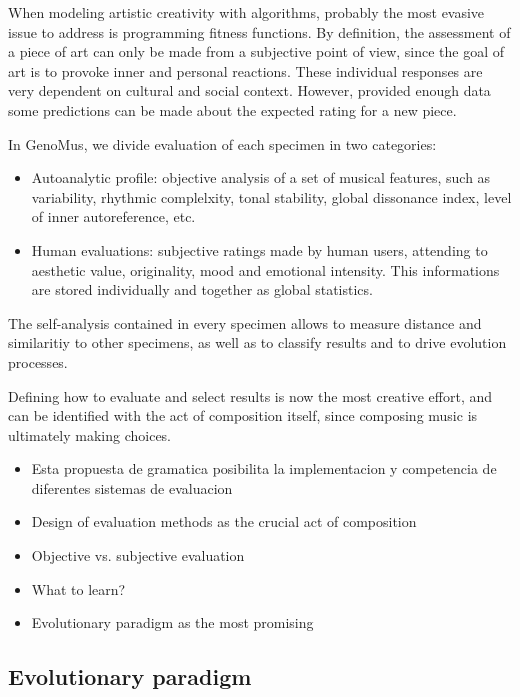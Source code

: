 \documentclass{article}
\begin{document}
When modeling artistic creativity with algorithms, probably the most evasive issue to address is programming fitness functions. By definition, the assessment of a piece of art can only be made from a subjective point of view, since the goal of art is to provoke inner and personal reactions. These individual responses are very dependent on cultural and social context. However, provided enough data some predictions can be made about the expected rating for a new piece.

In GenoMus, we divide evaluation of each specimen in two categories:

\begin{itemize}
\item Autoanalytic profile: objective analysis of a set of musical features, such as variability, rhythmic complelxity, tonal stability, global dissonance index, level of inner autoreference, etc. 
\item Human evaluations: subjective ratings made by human users, attending to aesthetic value, originality, mood and emotional intensity. This informations are stored individually and together as global statistics.

\end{itemize}

The self-analysis contained in every specimen allows to measure distance and similaritiy to  
other specimens, as well as to classify results and to drive evolution processes.

Defining how to evaluate and select results is now the most creative effort, and can be identified with the act of composition itself, since composing music is ultimately making choices. 


{\color{red}


\begin{itemize}
\item Esta propuesta de gramatica posibilita la implementacion y competencia de diferentes sistemas de evaluacion
\item Design of evaluation methods as the crucial act of composition
\item Objective vs. subjective evaluation
\item What to learn?
\item Evolutionary paradigm as the most promising
\end{itemize}


}


\subsection{Evolutionary paradigm}
\end{document}
